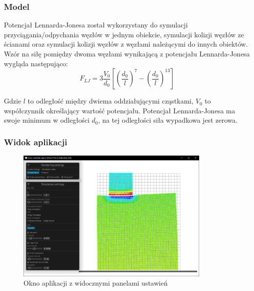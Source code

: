 \documentclass{beamer}
\begin{document}
\begin{frame}
    \frametitle{Model}
    Potencjał Lennarda-Jonesa został wykorzystany do symulacji przyciągania/odpychania węzłów w jednym obiekcie,
    symulacji kolizji węzłów ze ścianami oraz symulacji kolizji węzłów z węzłami należącymi
    do innych obiektów. Wzór na siłę pomiędzy dwoma węzłami wynikającą z potencjału Lennarda-Jonesa wygląda następująco:
    \begin{equation}
        F_{LJ} = 3\frac{V_0}{d_0} \left[ \left(\frac{d_0}{l}\right)^{7} - \left(\frac{d_0}{l}\right)^{13} \right]
    \end{equation}

    Gdzie $l$ to odległość między dwiema oddziałującymi cząstkami, $V_0$ to współczynnik określający wartość potencjału.
    Potencjał Lennarda-Jonesa ma swoje minimum w odległości $d_0$, na tej odległości siła wypadkowa jest zerowa.
\end{frame}

\begin{frame}
    \frametitle{Widok aplikacji}
    \begin{figure}[H]
        \centering
        \includegraphics[width=9.5cm]{app_view_full.png}
        \caption{Okno aplikacji z widocznymi panelami ustawień}
    \end{figure}
\end{frame}
\end{document}
